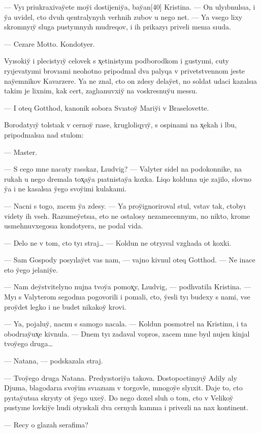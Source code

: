 \documentclass[10pt]{book}
\begin{document}
— Vyı priukraxivay̆ete moy̆i dostijeniy̆a, bay̆an[40] Kristina. — On ulyıbnulsıa, i y̆a uvidel, cto dvuh qentralynyıh verhnih zubov u nego net. — Ya vsego lixy skromnyıy̆ sluga pustyınnyıh mudreqov, i ih prikazyı priveli menıa sıuda.

— Cezare Motto. Kondotyer.

Vyısokiy̆ i plecistyıy̆ celovek s x̨etinistyım podborodkom i gustyımi, cuty ryıjevatyımi brovıami neohotno pripodnıal dva palyqa v privetstvennom jeste nay̆emnikov Kavarzere. Ya ne znal, cto on zdesy delay̆et, no soldat udaci kazalsıa takim je lixnim, kak cert, zaglıanuvxiy̆ na voskresnuy̆u messu.

— I oteq Gotthod, kanonik sobora Svıatoy̆ Mariy̆i v Braselovette.

Borodatyıy̆ tolstıak v cernoy̆ rıase, krugloliqyıy̆, s ospinami na x̨ekah i lbu, pripodnıalsıa nad stulom:

— Master.

— S cego mne nacaty rasskaz, Lıudvig? — Valyter sidel na podokonnike, na rukah u nego dremala tox̨ay̆a pıatnistay̆a koxka. Liqo kolduna uje zajilo, slovno y̆a i ne kasalsıa y̆ego svoy̆imi kulakami.

— Nacni s togo, zacem y̆a zdesy. — Ya proy̆ignoriroval stul, vstav tak, ctobyı videty ih vseh. Razumey̆etsıa, eto ne ostalosy nezamecennyım, no nikto, krome usmehnuvxegosıa kondotyera, ne podal vida.

— Delo ne v tom, cto tyı straj… — Koldun ne otryıval vzglıada ot koxki.

— Sam Gospody posyılay̆et vas nam, — vajno kivnul oteq Gotthod. — Ne inace eto y̆ego jelaniy̆e.

— Nam dey̆stvitelyno nujna tvoy̆a pomox̨y, Lıudvig, — podhvatila Kristina. — Myı s Valyterom segodnıa pogovorili i ponıali, cto, y̆esli tyı budexy s nami, vse proy̆det legko i ne budet nikakoy̆ krovi.

— Ya, pojaluy̆, nacnu s samogo nacala. — Koldun posmotrel na Kristinu, i ta obodrıay̆ux̨e kivnula. — Dnem tyı zadaval vopros, zacem mne byıl nujen kinjal tvoy̆ego druga…

— Natana, — podskazala straj.

— Tvoy̆ego druga Natana. Predyıstoriy̆a takova. Dostopoctimyıy̆ Adily aly Djuma, blagodarıa svoy̆im svıazıam v torgovle, mnogoy̆e slyıxit. Daje to, cto pyıtay̆utsıa skryıty ot y̆ego uxey̆. Do nego doxel sluh o tom, cto v Velikoy̆ pustyıne lovkiy̆e lıudi otyıskali dva cernyıh kamnıa i privezli na nax kontinent.

— Recy o glazah serafima?
\end{document}

